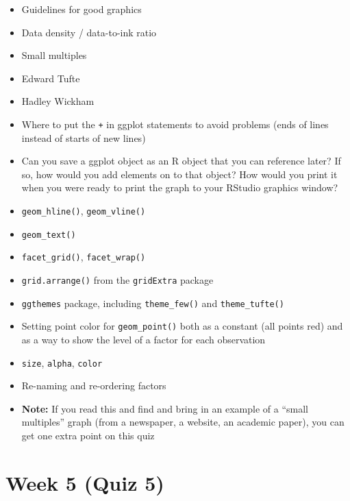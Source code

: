\documentclass[]{book}
\providecommand{\tightlist}{%
  \setlength{\itemsep}{0pt}\setlength{\parskip}{0pt}}
\theoremstyle{definition}
\theoremstyle{definition}
\theoremstyle{definition}
\theoremstyle{remark}
\begin{document}
\begin{itemize}
\tightlist
\item
  Guidelines for good graphics
\item
  Data density / data-to-ink ratio
\item
  Small multiples
\item
  Edward Tufte
\item
  Hadley Wickham
\item
  Where to put the \texttt{+} in ggplot statements to avoid problems
  (ends of lines instead of starts of new lines)
\item
  Can you save a ggplot object as an R object that you can reference
  later? If so, how would you add elements on to that object? How would
  you print it when you were ready to print the graph to your RStudio
  graphics window?
\item
  \texttt{geom\_hline()}, \texttt{geom\_vline()}
\item
  \texttt{geom\_text()}
\item
  \texttt{facet\_grid()}, \texttt{facet\_wrap()}
\item
  \texttt{grid.arrange()} from the \texttt{gridExtra} package
\item
  \texttt{ggthemes} package, including \texttt{theme\_few()} and
  \texttt{theme\_tufte()}
\item
  Setting point color for \texttt{geom\_point()} both as a constant (all
  points red) and as a way to show the level of a factor for each
  observation
\item
  \texttt{size}, \texttt{alpha}, \texttt{color}
\item
  Re-naming and re-ordering factors
\item
  \textbf{Note:} If you read this and find and bring in an example of a
  ``small multiples'' graph (from a newspaper, a website, an academic
  paper), you can get one extra point on this quiz
\end{itemize}

\section{Week 5 (Quiz 5)}\label{week-5-quiz-5}
\end{document}
